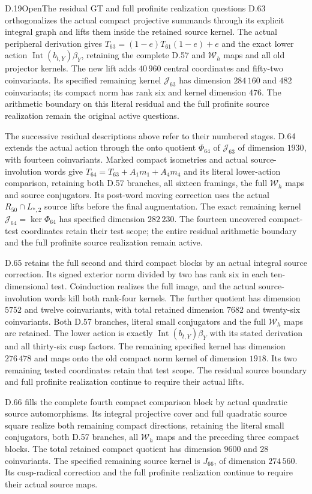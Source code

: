 \begin{statement}{D.19}{Open}{The residual GT and full profinite realization questions}
D.63 orthogonalizes the actual compact projective summands
through its explicit integral graph and lifts them inside the
retained source kernel. The actual peripheral derivation gives
$T_{63}=(1-e)T_{61}(1-e)+e$ and the exact lower action
$\operatorname{Int}(b_{t,Y})\beta_Y$, retaining the complete
D.57 and $\mathcal W_h$ maps and all old projector kernels.
The new lift adds $40\,960$ central coordinates and fifty-two
coinvariants. Its specified remaining kernel $\mathcal J_{63}$
has dimension $284\,160$ and $482$ coinvariants; its compact
norm has rank six and kernel dimension $476$.
The arithmetic boundary on this literal residual and the
full profinite source realization remain the original active
questions.

The successive residual descriptions above refer to their
numbered stages. D.64 extends the actual action through the
onto quotient $\Phi_{64}$ of $\mathcal J_{63}$ of dimension
$1930$, with fourteen coinvariants. Marked compact isometries
and actual source-involution words give
$T_{64}=T_{63}+A_1m_1+A_4m_4$ and its literal lower-action
comparison, retaining both D.57 branches, all sixteen framings,
the full $\mathcal W_h$ maps and source conjugators.
Its post-word moving correction uses the actual
$R_{50}\cap L_{*,2}$ source lifts before the final augmentation.
The exact remaining kernel $\mathcal J_{64}=\ker\Phi_{64}$
has specified dimension $282\,230$.
The fourteen uncovered compact-test coordinates retain
their test scope; the entire residual arithmetic boundary
and the full profinite source realization remain active.

D.65 retains the full second and third compact blocks by an actual
integral source correction. Its signed exterior norm divided by two
has rank six in each ten-dimensional test. Coinduction realizes the
full image, and the actual source-involution words kill both rank-four
kernels. The further quotient has dimension $5752$ and twelve
coinvariants, with total retained dimension $7682$ and twenty-six
coinvariants. Both D.57 branches, literal small conjugators and the
full $\mathcal W_h$ maps are retained. The lower action is exactly
$\operatorname{Int}(b_{t,Y})\beta_Y$ with its stated derivation and
all thirty-six cusp factors. The remaining specified kernel has
dimension $276\,478$ and maps onto the old compact norm kernel of
dimension $1918$. Its two remaining tested coordinates retain that
test scope. The residual source boundary and full profinite
realization continue to require their actual lifts.

D.66 fills the complete fourth compact comparison block by actual
quadratic source automorphisms. Its integral projective cover and full
quadratic source square realize both remaining compact directions,
retaining the literal small conjugators, both D.57 branches, all
$\mathcal W_h$ maps and the preceding three compact blocks. The total
retained compact quotient has dimension $9600$ and $28$ coinvariants.
The specified remaining source kernel is $J_{66}$, of dimension
$274\,560$. Its cusp-radical correction and the full profinite
realization continue to require their actual source maps.
\end{statement}
